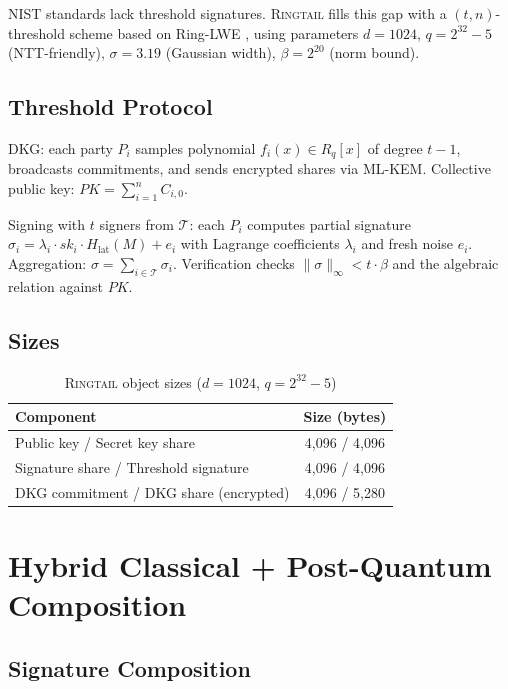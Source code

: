 \documentclass[11pt,letterpaper]{article}
\theoremstyle{definition}
\theoremstyle{remark}
\newcommand{\Ringtail}{\textsc{Ringtail}}
\newcommand{\MLKEM}{\textsc{ML-KEM}}
\begin{document}
NIST standards lack threshold signatures. \Ringtail{} fills this gap with a $(t, n)$-threshold scheme based on Ring-LWE \cite{lyubashevsky2010ideal, lux-ringtail-pq}, using parameters $d = 1024$, $q = 2^{32} - 5$ (NTT-friendly), $\sigma = 3.19$ (Gaussian width), $\beta = 2^{20}$ (norm bound).

\subsection{Threshold Protocol}

DKG: each party $P_i$ samples polynomial $f_i(x) \in R_q[x]$ of degree $t - 1$, broadcasts commitments, and sends encrypted shares via \MLKEM{}. Collective public key: $PK = \sum_{i=1}^{n} C_{i,0}$.

Signing with $t$ signers from $\mathcal{T}$: each $P_i$ computes partial signature $\sigma_i = \lambda_i \cdot sk_i \cdot H_{\text{lat}}(M) + e_i$ with Lagrange coefficients $\lambda_i$ and fresh noise $e_i$. Aggregation: $\sigma = \sum_{i \in \mathcal{T}} \sigma_i$. Verification checks $\|\sigma\|_\infty < t \cdot \beta$ and the algebraic relation against $PK$.

\subsection{Sizes}

\begin{table}[h]
\centering
\begin{tabular}{lc}
\toprule
\textbf{Component} & \textbf{Size (bytes)} \\
\midrule
Public key / Secret key share & 4,096 / 4,096 \\
Signature share / Threshold signature & 4,096 / 4,096 \\
DKG commitment / DKG share (encrypted) & 4,096 / 5,280 \\
\bottomrule
\end{tabular}
\caption{\Ringtail{} object sizes ($d = 1024$, $q = 2^{32} - 5$)}
\label{tab:ringtail-sizes}
\end{table}

\section{Hybrid Classical + Post-Quantum Composition}

\subsection{Signature Composition}
\end{document}
